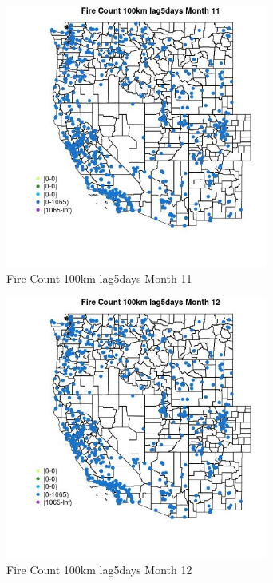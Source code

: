 \begin{figure} 
\centering  
\includegraphics[width=0.77\textwidth]{Code_Outputs/Report_ML_input_PM25_Step4_part_f_de_duplicated_aves_prioritize_24hr_obswNAs_MapObsMo11Fire_Count_100km_lag5days.jpg} 
\caption{\label{fig:Report_ML_input_PM25_Step4_part_f_de_duplicated_aves_prioritize_24hr_obswNAsMapObsMo11Fire_Count_100km_lag5days}Fire Count 100km lag5days Month 11} 
\end{figure} 
 

\begin{figure} 
\centering  
\includegraphics[width=0.77\textwidth]{Code_Outputs/Report_ML_input_PM25_Step4_part_f_de_duplicated_aves_prioritize_24hr_obswNAs_MapObsMo12Fire_Count_100km_lag5days.jpg} 
\caption{\label{fig:Report_ML_input_PM25_Step4_part_f_de_duplicated_aves_prioritize_24hr_obswNAsMapObsMo12Fire_Count_100km_lag5days}Fire Count 100km lag5days Month 12} 
\end{figure} 
 

